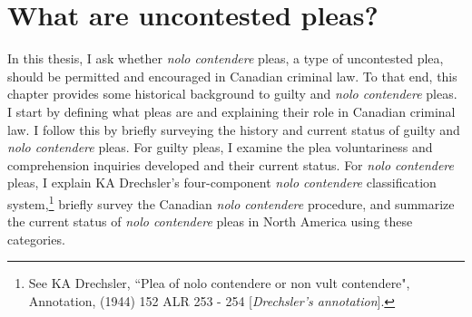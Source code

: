 \chapter{What are uncontested pleas?}

\setcounter{footnote}{13}

In this thesis, I ask whether \textit{nolo contendere} pleas, a type of uncontested plea, should be permitted and encouraged in Canadian criminal law. To that end, this chapter provides some historical background to guilty and \textit{nolo contendere} pleas. I start by defining what pleas are and explaining their role in Canadian criminal law. I follow this by briefly surveying the history and current status of guilty and \textit{nolo contendere} pleas. For guilty pleas, I examine the plea voluntariness and comprehension inquiries developed and their current status. For \textit{nolo contendere} pleas, I explain KA Drechsler's four-component \textit{nolo contendere} classification system,\footnote{See KA Drechsler, ``Plea of nolo contendere or non vult contendere", Annotation, (1944) 152 ALR 253 - 254 [\textit{Drechsler's annotation}].} briefly survey the Canadian \textit{nolo contendere} procedure, and summarize the current status of \textit{nolo contendere} pleas in North America using these categories.

